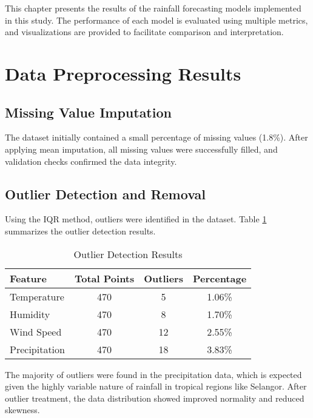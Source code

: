 \documentclass[12pt]{article}
\begin{document}
This chapter presents the results of the rainfall forecasting models implemented in this study. The performance of each model is evaluated using multiple metrics, and visualizations are provided to facilitate comparison and interpretation.

\section{Data Preprocessing Results}
\label{sec:preprocessing_results}

\subsection{Missing Value Imputation}
\label{subsec:missing_value_results}

The dataset initially contained a small percentage of missing values (1.8\%). After applying mean imputation, all missing values were successfully filled, and validation checks confirmed the data integrity.

\subsection{Outlier Detection and Removal}
\label{subsec:outlier_results}

Using the IQR method, outliers were identified in the dataset. Table \ref{tab:outlier_detection} summarizes the outlier detection results.

\begin{table}[h]
\centering
\caption{Outlier Detection Results}
\label{tab:outlier_detection}
\begin{tabular}{|l|c|c|c|}
\hline
\textbf{Feature} & \textbf{Total Points} & \textbf{Outliers} & \textbf{Percentage} \\
\hline
Temperature & 470 & 5 & 1.06\% \\
\hline
Humidity & 470 & 8 & 1.70\% \\
\hline
Wind Speed & 470 & 12 & 2.55\% \\
\hline
Precipitation & 470 & 18 & 3.83\% \\
\hline
\end{tabular}
\end{table}

The majority of outliers were found in the precipitation data, which is expected given the highly variable nature of rainfall in tropical regions like Selangor. After outlier treatment, the data distribution showed improved normality and reduced skewness.
\end{document}
